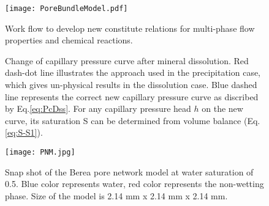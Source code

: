 \documentclass[preprint,12pt,authoryear]{elsarticle}
\begin{document}






\printnomenclature









\begin{figure}[h]
\centering\texttt{[image: PoreBundleModel.pdf]}
\caption{Work flow to develop new constitute relations for multi-phase flow properties and chemical reactions.}\label{fig:workflow} 
\end{figure}


\begin{figure} 
\centering \newlength\figureheight \newlength\figurewidth\setlength\figureheight{6cm} \setlength\figurewidth{6cm}  \caption{Change of capillary pressure curve after mineral dissolution. Red dash-dot line illustrates the approach used in the precipitation case, which gives un-physical results in the dissolution case. Blue dashed line represents the correct new capillary pressure curve as discribed by Eq.\ref{eq:PcDss}. For any capillary pressure head $h$ on the new curve, its saturation S can be determined from volume balance (Eq.\ref{eq:S-S1}). } \label{fig:example} 
\end{figure}

\begin{figure}[h]
\centering\texttt{[image: PNM.jpg]}
\caption{Snap shot of the Berea pore network model at water saturation of 0.5. Blue color represents water, red color represents the non-wetting phase. Size of the model is 2.14 mm x 2.14 mm x 2.14 mm.}\label{fig:PNM} 
\end{figure}
\end{document}
